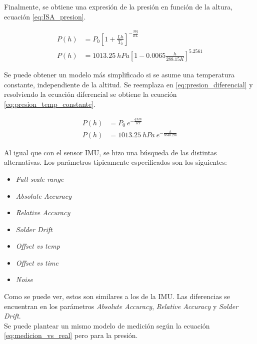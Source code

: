 Finalmente, se obtiene una expresión de la presión en función de la altura, ecuación \eqref{eq:ISA_presion}. 

\begin{subequations}
    \begin{align}
        P(h) &= P_0 \left[ 1 + \frac{L h}{T_0} \right]^{-\frac{M g}{R L}}\\
        P(h) &= 1013.25 \ hPa \left[ 1 - 0.0065 \frac{h}{288.15 K} \right]^{5.2561}
    \end{align}
    \label{eq:ISA_presion}
\end{subequations}

Se puede obtener un modelo más simplificado si se asume una temperatura constante, independiente de la altitud. Se reemplaza en \eqref{eq:presion_diferencial} y resolviendo la ecuación diferencial se obtiene la ecuación \eqref{eq:presion_temp_constante}.

\begin{subequations}
    \begin{align}
        P(h) &= P_0 \ e^{-\frac{g M h}{R T}}\\
        P(h) &= 1013.25 \ hPa \ e^{-\frac{h}{8840.2 m} }
    \end{align}
    \label{eq:presion_temp_constante}
\end{subequations}

Al igual que con el sensor IMU, se hizo una búsqueda de las distintas alternativas. Los parámetros típicamente especificados son los siguientes:

\begin{itemize}
    \item \textit{Full-scale range}
    \item \textit{Absolute Accuracy}
    \item \textit{Relative Accuracy}
    \item \textit{Solder Drift}
    \item \textit{Offset vs temp}
    \item \textit{Offset vs time}
    \item \textit{Noise}
\end{itemize}

Como se puede ver, estos son similares a los de la IMU. Las diferencias se encuentran en los parámetros \textit{Absolute Accuracy}, \textit{Relative Accuracy} y \textit{Solder Drift}.\\

Se puede plantear un mismo modelo de medición según la ecuación \ref{eq:medicion_vs_real} pero para la presión.

